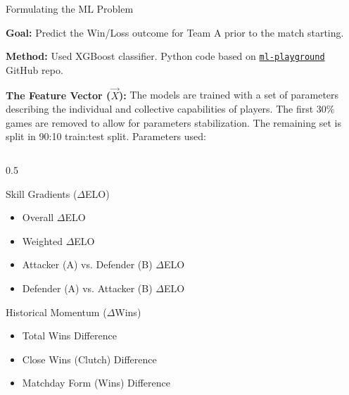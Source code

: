 \documentclass[10pt, aspectratio=169]{beamer}
\begin{document}
\begin{frame}{Formulating the ML Problem}
\fontsize{8pt}{9pt}\selectfont

    \noindent\textbf{Goal:} Predict the Win/Loss outcome for Team A prior to the match starting.
    
    \noindent\textbf{Method:} Used XGBoost classifier. Python code based on \href{https://github.com/NunonuN/ml-playground}{\texttt{ml-playground}} GitHub repo.

    \noindent\textbf{The Feature Vector ($\vec{X}$):} 
    The models are trained with a set of parameters describing the individual and collective capabilities of players. The first $30\%$ games are removed to allow for parameters stabilization. The remaining set is split in 90:10 train:test split. Parameters used:

\begin{columns}[T]
        \begin{column}{0.5\textwidth}
            \begin{block}{Skill Gradients ($\Delta$ELO)}
                \begin{itemize}
                    \item Overall $\Delta$ELO
                    \item Weighted $\Delta$ELO
                    \item Attacker (A) vs. Defender (B) $\Delta$ELO
                    \item Defender (A) vs. Attacker (B) $\Delta$ELO
                \end{itemize}
            \end{block}
            
            \begin{block}{Historical Momentum ($\Delta$Wins)}
                \begin{itemize}
                    \item Total Wins Difference
                    \item Close Wins (Clutch) Difference
                    \item Matchday Form (Wins) Difference
                \end{itemize}
            \end{block}
        \end{column}
        

\end{columns}
\end{frame}
\end{document}
